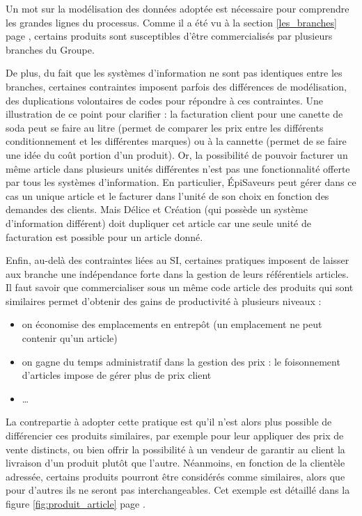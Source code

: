             Un mot sur la modélisation des données adoptée est nécessaire pour comprendre les grandes lignes du processus.
            Comme il a été vu à la section \ref{les_branches} page \pageref{les_branches}, certains produits sont susceptibles d'être commercialisés par plusieurs branches du Groupe.
            
            De plus, du fait que les systèmes d'information ne sont pas identiques entre les branches, certaines contraintes imposent parfois des différences de modélisation, des duplications volontaires de codes pour répondre à ces contraintes.
            Une illustration de ce point pour clarifier : la facturation client pour une canette de soda peut se faire au litre (permet de comparer les prix entre les différents conditionnement et les différentes marques) ou à la cannette (permet de se faire une idée du coût portion d'un produit).
            Or, la possibilité de pouvoir facturer un même article dans plusieurs unités différentes n'est pas une fonctionnalité offerte par tous les systèmes d'information.
            En particulier, \'{E}piSaveurs peut gérer dans ce cas un unique article et le facturer dans l'unité de son choix en fonction des demandes des clients.
            Mais Délice et Création (qui possède un système d'information différent) doit dupliquer cet article car une seule unité de facturation est possible pour un article donné.

            Enfin, au-delà des contraintes liées au SI, certaines pratiques imposent de laisser aux branche une indépendance forte dans la gestion de leurs référentiels articles.
            Il faut savoir que commercialiser sous un même code article des produits qui sont similaires permet d'obtenir des gains de productivité à plusieurs niveaux :
            \begin{itemize}
                \item on économise des emplacements en entrepôt (un emplacement ne peut contenir qu'un article)
                \item on gagne du temps administratif dans la gestion des prix : le foisonnement d'articles impose de gérer plus de prix client
                \item \dots
            \end{itemize}
            La contrepartie à adopter cette pratique est qu'il n'est alors plus possible de différencier ces produits similaires, par exemple pour leur appliquer des prix de vente distincts, ou bien offrir la possibilité à un vendeur de garantir au client la livraison d'un produit plutôt que l'autre.
            Néanmoins, en fonction de la clientèle adressée, certains produits pourront être considérés comme similaires, alors que pour d'autres ils ne seront pas interchangeables.
            Cet exemple est détaillé dans la figure \ref{fig:produit_article} page \pageref{fig:produit_article}.

